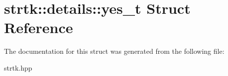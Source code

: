 \hypertarget{structstrtk_1_1details_1_1yes__t}{\section{strtk\-:\-:details\-:\-:yes\-\_\-t Struct Reference}
\label{structstrtk_1_1details_1_1yes__t}
}


The documentation for this struct was generated from the following file\-:\begin{DoxyCompactItemize}
\item 
strtk.\-hpp\end{DoxyCompactItemize}
